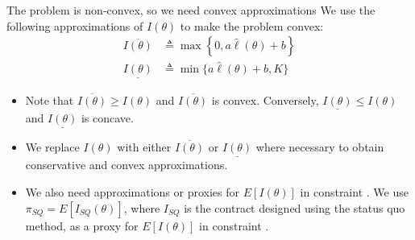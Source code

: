 \documentclass{beamer}
\begin{document}
\begin{frame}{The problem is non-convex, so we need convex approximations}
\label{convex-approx}
We use the following approximations of $I(\theta)$ to make the problem convex: 
\begin{align*}
    \overline{I(\theta)} &\triangleq \max \left \{ 0,a\hat{\ell}(\theta) + b\right \} \\
    \underline{I(\theta)} &\triangleq \min \{ a\hat{\ell}(\theta) + b,K \}
\end{align*}
\begin{itemize}
    \item Note that $\overline{I(\theta)} \geq I(\theta)$ and $\overline{I(\theta)}$ is convex. Conversely, $\underline{I(\theta)} \leq I(\theta)$ and $\underline{I(\theta)}$ is concave. 
    \item We replace $I(\theta)$ with either $\overline{I(\theta)}$ or $\underline{I(\theta)}$ where necessary to obtain conservative and convex approximations. 
    \item We also need approximations or proxies for $E[I(\theta)]$ in constraint . We use $\pi_{SQ} = E[I_{SQ}(\theta)]$, where $I_{SQ}$ is the contract designed using the status quo method, as a proxy for $E[I(\theta)]$ in constraint .
\end{itemize}
\end{frame}
\end{document}
